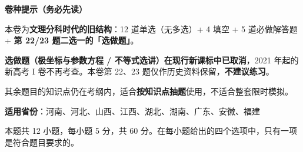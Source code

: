 

\begin{gknotice}
\textbf{ 卷种提示（务必先读）}

本卷为\textbf{文理分科时代的旧结构}：12 道单选（无多选）+ 4 填空 + 5 道必做解答题 + \textbf{第 22/23 题二选一的「选做题」}。

\textbf{选做题（极坐标与参数方程 / 不等式选讲）在现行新课标中已取消}，2021 年起的新高考 I 卷不再考查。本卷第 22、23 题仅作历史资料保留，\textbf{不建议练习}。

其余题目的知识点仍在考纲内，适合\textbf{按知识点抽题}使用，不适合整套限时模拟。

\textbf{适用省份}：河南、河北、山西、江西、湖北、湖南、广东、安徽、福建
\end{gknotice}

\par\medskip


\begin{gktip}
本题共 12 小题，每小题 5 分，共 60 分。在每小题给出的四个选项中，只有一项是符合题目要求的。
\end{gktip}

